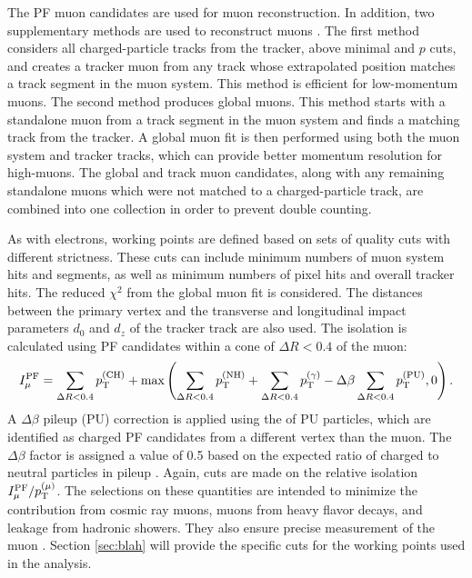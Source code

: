 \documentclass[12pt]{thesis}  %
\begin{document}
The PF muon candidates are used for muon reconstruction. In addition, two supplementary methods are used to reconstruct muons \cite{CMS-PAS-MUO-10-002}. The first method considers all charged-particle tracks from the tracker, above minimal \pt and $p$ cuts, and creates a tracker muon from any track whose extrapolated position matches a track segment in the muon system. This method is efficient for low-momentum muons. The second method produces global muons. This method starts with a standalone muon from a track segment in the muon system and finds a matching track from the tracker. A global muon fit is then performed using both the muon system and tracker tracks, which can provide better momentum resolution for high-\pt muons. The global and track muon candidates, along with any remaining standalone muons which were not matched to a charged-particle track, are combined into one collection in order to prevent double counting.

As with electrons, working points are defined based on sets of quality cuts with different strictness. These cuts can include minimum numbers of muon system hits and segments, as well as minimum numbers of pixel hits and overall tracker hits. The reduced $\chi^2$ from the global muon fit is considered. The distances between the primary vertex and the transverse and longitudinal impact parameters $d_0$ and $d_z$ of the tracker track are also used. The isolation is calculated using PF candidates within a cone of $\Delta R < 0.4$ of the muon:
\begin{equation}
I^{\text{PF}}_{\mu} = \sum_{\Delta R < 0.4}{p_{\mathrm{T}}^{(\text{CH})}} + \text{max}\left( \sum_{\Delta R < 0.4}{p_{\mathrm{T}}^{(\text{NH})}} + \sum_{\Delta R < 0.4}{p_{\mathrm{T}}^{(\gamma)}} - \Delta\beta \sum_{\Delta R < 0.4}{p_{\mathrm{T}}^{(\text{PU})}}, 0 \right).
\end{equation}
A $\Delta\beta$ pileup (PU) correction is applied using the \pt of PU particles, which are identified as charged PF candidates from a different vertex than the muon. The $\Delta\beta$ factor is assigned a value of 0.5 based on the expected ratio of charged to neutral particles in pileup \cite{CMS-PAS-PFT-10-002}. Again, cuts are made on the relative isolation $I^{\text{PF}}_{\mu}/p_{\mathrm{T}}^{(\mu)}$. The selections on these quantities are intended to minimize the contribution from cosmic ray muons, muons from heavy flavor decays, and leakage from hadronic showers. They also ensure precise measurement of the muon \pt. Section \ref{sec:blah} will provide the specific cuts for the working points used in the analysis.
\end{document}
